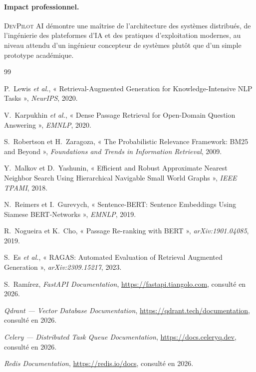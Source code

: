 \documentclass[12pt,a4paper,oneside]{report}
\newcommand{\devpilot}{\textsc{DevPilot AI}}
\begin{document}
\paragraph{Impact professionnel.} \devpilot{} démontre une maîtrise de
l'architecture des systèmes distribués, de l'ingénierie des plateformes d'IA et
des pratiques d'exploitation modernes, au niveau attendu d'un ingénieur
concepteur de systèmes plutôt que d'un simple prototype académique.

\begin{thebibliography}{99}

 P.~Lewis \emph{et al.}, « Retrieval-Augmented Generation
for Knowledge-Intensive NLP Tasks », \emph{NeurIPS}, 2020.

 V.~Karpukhin \emph{et al.}, « Dense Passage Retrieval
for Open-Domain Question Answering », \emph{EMNLP}, 2020.

 S.~Robertson et H.~Zaragoza, « The Probabilistic
Relevance Framework: BM25 and Beyond », \emph{Foundations and Trends in
Information Retrieval}, 2009.

 Y.~Malkov et D.~Yashunin, « Efficient and Robust
Approximate Nearest Neighbor Search Using Hierarchical Navigable Small World
Graphs », \emph{IEEE TPAMI}, 2018.

 N.~Reimers et I.~Gurevych, « Sentence-BERT: Sentence
Embeddings Using Siamese BERT-Networks », \emph{EMNLP}, 2019.

 R.~Nogueira et K.~Cho, « Passage Re-ranking with
BERT », \emph{arXiv:1901.04085}, 2019.

 S.~Es \emph{et al.}, « RAGAS: Automated Evaluation of
Retrieval Augmented Generation », \emph{arXiv:2309.15217}, 2023.

 S.~Ramírez, \emph{FastAPI Documentation},
\url{https://fastapi.tiangolo.com}, consulté en 2026.

 \emph{Qdrant — Vector Database Documentation},
\url{https://qdrant.tech/documentation}, consulté en 2026.

 \emph{Celery — Distributed Task Queue Documentation},
\url{https://docs.celeryq.dev}, consulté en 2026.

 \emph{Redis Documentation}, \url{https://redis.io/docs}, consulté
en 2026.


\end{thebibliography}
\end{document}
